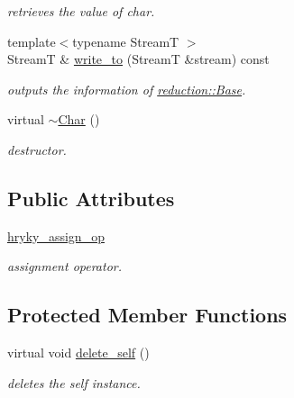 \begin{DoxyCompactItemize}
\begin{DoxyCompactList}\small\item\em retrieves the value of char. \end{DoxyCompactList}\item 
\hypertarget{classhryky_1_1reduction_1_1_base_a709cc7c48e1c90fe253739e46d82aa19}{{\footnotesize template$<$typename Stream\-T $>$ }\\Stream\-T \& \hyperlink{classhryky_1_1reduction_1_1_base_a709cc7c48e1c90fe253739e46d82aa19}{write\-\_\-to} (Stream\-T \&stream) const }\label{classhryky_1_1reduction_1_1_base_a709cc7c48e1c90fe253739e46d82aa19}

\begin{DoxyCompactList}\small\item\em outputs the information of \hyperlink{classhryky_1_1reduction_1_1_base}{reduction\-::\-Base}. \end{DoxyCompactList}\item 
\hypertarget{classhryky_1_1reduction_1_1_char_a0ab9d154d1eb6976068c360719d19c09}{virtual \hyperlink{classhryky_1_1reduction_1_1_char_a0ab9d154d1eb6976068c360719d19c09}{$\sim$\-Char} ()}\label{classhryky_1_1reduction_1_1_char_a0ab9d154d1eb6976068c360719d19c09}

\begin{DoxyCompactList}\small\item\em destructor. \end{DoxyCompactList}\end{DoxyCompactItemize}
\subsection*{Public Attributes}
\begin{DoxyCompactItemize}
\item 
\hypertarget{classhryky_1_1reduction_1_1_char_a3a615d6355aafe80b24a1365b1b27d73}{\hyperlink{classhryky_1_1reduction_1_1_char_a3a615d6355aafe80b24a1365b1b27d73}{hryky\-\_\-assign\-\_\-op}}\label{classhryky_1_1reduction_1_1_char_a3a615d6355aafe80b24a1365b1b27d73}

\begin{DoxyCompactList}\small\item\em assignment operator. \end{DoxyCompactList}\end{DoxyCompactItemize}
\subsection*{Protected Member Functions}
\begin{DoxyCompactItemize}
\item 
virtual void \hyperlink{classhryky_1_1reduction_1_1_base_a100265b04179500cd7901c8afea64eb0}{delete\-\_\-self} ()
\begin{DoxyCompactList}\small\item\em deletes the self instance. \end{DoxyCompactList}\end{DoxyCompactItemize}



